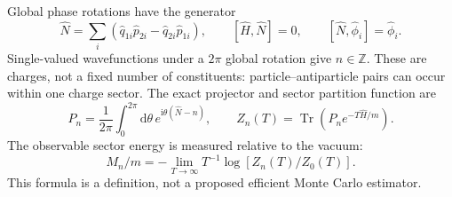 \documentclass[11pt,a4paper]{article}
\newcommand{\dd}{\mathrm d}
\newcommand{\ii}{\mathrm i}
\newcommand{\Tr}{\operatorname{Tr}}
\begin{document}
Global phase rotations have the generator
\begin{equation}\label{eq:charge}
 \hat N=\sum_i(\hat q_{1i}\hat p_{2i}-\hat q_{2i}\hat p_{1i}),
 \qquad [\hat H,\hat N]=0,\qquad [\hat N,\hat\phi_i]=\hat\phi_i.
\end{equation}
Single-valued wavefunctions under a $2\pi$ global rotation give
$n\in\mathbb Z$. These are charges, not a fixed number of constituents:
particle--antiparticle pairs can occur within one charge sector.
The exact projector and sector partition function are
\begin{equation}\label{eq:projector}
 P_n=\frac1{2\pi}\int_0^{2\pi}\dd\theta\,
 e^{\ii\theta(\hat N-n)},\qquad
 Z_n(T)=\Tr(P_n e^{-T\hat H/m}).
\end{equation}
The observable sector energy is measured relative to the vacuum:
\begin{equation}
 M_n/m=-\lim_{T\to\infty}T^{-1}\log[Z_n(T)/Z_0(T)].
\end{equation}
This formula is a definition, not a proposed efficient Monte Carlo estimator.
\end{document}
